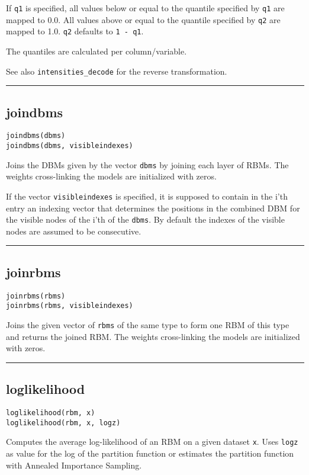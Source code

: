 If \texttt{q1} is specified, all values below or equal to the quantile specified  by \texttt{q1} are mapped to 0.0. All values above or equal to the quantile specified by \texttt{q2} are mapped to 1.0. \texttt{q2} defaults to \texttt{1 - q1}.

The quantiles are calculated per column/variable.

See also \texttt{intensities\_decode} for the reverse transformation.

\noindent\rule{\textwidth}{1pt}
\subsection*{joindbms}
\begin{verbatim}
joindbms(dbms)
joindbms(dbms, visibleindexes)
\end{verbatim}
Joins the DBMs given by the vector \texttt{dbms} by joining each layer of RBMs. The weights cross-linking the models are initialized with zeros.

If the vector \texttt{visibleindexes} is specified, it is supposed to contain in the i'th entry an indexing vector that determines the positions in the combined DBM for the visible nodes of the i'th of the \texttt{dbms}. By default the indexes of the visible nodes are assumed to be consecutive.

\noindent\rule{\textwidth}{1pt}
\subsection*{joinrbms}
\begin{verbatim}
joinrbms(rbms)
joinrbms(rbms, visibleindexes)
\end{verbatim}
Joins the given vector of \texttt{rbms} of the same type to form one RBM of this type and returns the joined RBM. The weights cross-linking the models are initialized with zeros.

\noindent\rule{\textwidth}{1pt}
\subsection*{loglikelihood}
\begin{verbatim}
loglikelihood(rbm, x)
loglikelihood(rbm, x, logz)
\end{verbatim}
Computes the average log-likelihood of an RBM on a given dataset \texttt{x}. Uses \texttt{logz} as value for the log of the partition function or estimates the partition function with Annealed Importance Sampling.

